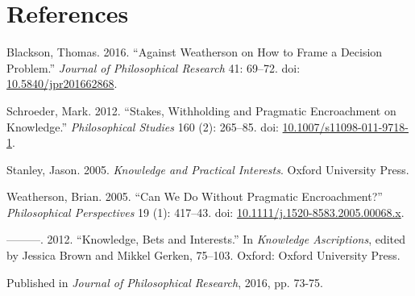 \documentclass[
  10pt,
  letterpaper,
  DIV=11,
  numbers=noendperiod,
  twoside]{scrartcl}
\newlength{\cslhangindent}
\newenvironment{CSLReferences}[2] %
 {\begin{list}{}{%
  \setlength{\itemindent}{0pt}
  \setlength{\leftmargin}{0pt}
  \setlength{\parsep}{0pt}
  \ifodd #1
   \setlength{\leftmargin}{\cslhangindent}
   \setlength{\itemindent}{-1\cslhangindent}
  \fi
  \setlength{\itemsep}{#2\baselineskip}}}
 {\end{list}}
\begin{document}
\section*{References}\label{references}

\label{refs}
\begin{CSLReferences}{1}{0}
Blackson, Thomas. 2016. {``Against Weatherson on How to Frame a Decision
Problem.''} \emph{Journal of Philosophical Research} 41: 69--72. doi:
\href{https://doi.org/10.5840/jpr201662868}{10.5840/jpr201662868}.

Schroeder, Mark. 2012. {``Stakes, Withholding and Pragmatic Encroachment
on Knowledge.''} \emph{Philosophical Studies} 160 (2): 265--85. doi:
\href{https://doi.org/10.1007/s11098-011-9718-1}{10.1007/s11098-011-9718-1}.

Stanley, Jason. 2005. \emph{{Knowledge and Practical Interests}}. Oxford
University Press.

Weatherson, Brian. 2005. {``{Can We Do Without Pragmatic
Encroachment?}''} \emph{Philosophical Perspectives} 19 (1): 417--43.
doi:
\href{https://doi.org/10.1111/j.1520-8583.2005.00068.x}{10.1111/j.1520-8583.2005.00068.x}.

---------. 2012. {``Knowledge, Bets and Interests.''} In \emph{Knowledge
Ascriptions}, edited by Jessica Brown and Mikkel Gerken, 75--103.
Oxford: Oxford University Press.

\end{CSLReferences}



\noindent Published in\emph{
Journal of Philosophical Research}, 2016, pp. 73-75.
\end{document}
